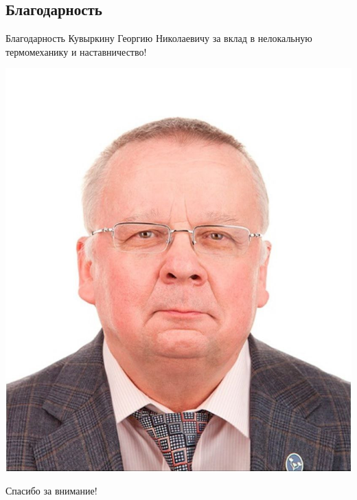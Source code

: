 \subsection{Благодарность}
\begin{frame}{Благодарность}
	\justifying
	Кувыркину Георгию Николаевичу за вклад в нелокальную термомеханику и наставничество!
	\begin{center}
		\includegraphics[height=0.65\textheight]{pics/Kuvyrkin.png}
	\end{center}
\end{frame}

\begin{frame} %
    \begin{center}
        \Huge
        Спасибо за внимание!
    \end{center}
\end{frame}
